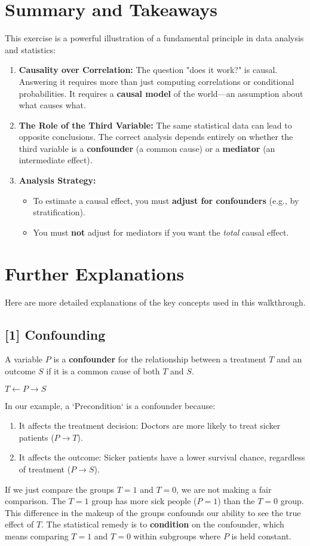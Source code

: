 \documentclass[11pt,a4paper]{article}
\begin{document}
\section{Summary and Takeaways}
This exercise is a powerful illustration of a fundamental principle in data analysis and statistics:
\begin{enumerate}
    \item \textbf{Causality over Correlation:} The question "does it work?" is causal. Answering it requires more than just computing correlations or conditional probabilities. It requires a \textbf{causal model} of the world—an assumption about what causes what.
    \item \textbf{The Role of the Third Variable:} The same statistical data can lead to opposite conclusions. The correct analysis depends entirely on whether the third variable is a \textbf{confounder} (a common cause) or a \textbf{mediator} (an intermediate effect).
    \item \textbf{Analysis Strategy:}
    \begin{itemize}
        \item To estimate a causal effect, you must \textbf{adjust for confounders} (e.g., by stratification).
        \item You must \textbf{not} adjust for mediators if you want the \textit{total} causal effect.
    \end{itemize}
\end{enumerate}


\newpage
\appendix
\section{Further Explanations}
Here are more detailed explanations of the key concepts used in this walkthrough.

\subsection{\hypertarget{sec:confounding}{[1] Confounding}}
A variable $P$ is a \textbf{confounder} for the relationship between a treatment $T$ and an outcome $S$ if it is a common cause of both $T$ and $S$.
\begin{center}
    $T \leftarrow P \to S$
\end{center}
In our example, a `Precondition` is a confounder because:
\begin{enumerate}
    \item It affects the treatment decision: Doctors are more likely to treat sicker patients ($P \to T$).
    \item It affects the outcome: Sicker patients have a lower survival chance, regardless of treatment ($P \to S$).
\end{enumerate}
If we just compare the groups $T=1$ and $T=0$, we are not making a fair comparison. The $T=1$ group has more sick people ($P=1$) than the $T=0$ group. This difference in the makeup of the groups confounds our ability to see the true effect of $T$. The statistical remedy is to \textbf{condition} on the confounder, which means comparing $T=1$ and $T=0$ within subgroups where $P$ is held constant.
\end{document}
